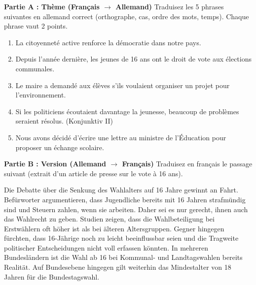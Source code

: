 \documentclass[11pt]{article}
\begin{document}
\begin{exercice}

\textbf{Partie A : Thème (Français $\rightarrow$ Allemand)}
Traduisez les 5 phrases suivantes en allemand correct (orthographe, cas, ordre des mots, temps). Chaque phrase vaut 2 points.

\begin{enumerate}
    \item La citoyenneté active renforce la démocratie dans notre pays.
    \item Depuis l'année dernière, les jeunes de 16 ans ont le droit de vote aux élections communales.
    \item Le maire a demandé aux élèves s'ils voulaient organiser un projet pour l'environnement.
    \item Si les politiciens écoutaient davantage la jeunesse, beaucoup de problèmes seraient résolus. (Konjunktiv II)
    \item Nous avons décidé d'écrire une lettre au ministre de l'Éducation pour proposer un échange scolaire.
\end{enumerate}

\textbf{Partie B : Version (Allemand $\rightarrow$ Français)}
Traduisez en français le passage suivant (extrait d'un article de presse sur le vote à 16 ans).

\begin{textebox}
Die Debatte über die Senkung des Wahlalters auf 16 Jahre gewinnt an Fahrt. Befürworter argumentieren, dass Jugendliche bereits mit 16 Jahren strafmündig sind und Steuern zahlen, wenn sie arbeiten. Daher sei es nur gerecht, ihnen auch das Wahlrecht zu geben. Studien zeigen, dass die Wahlbeteiligung bei Erstwählern oft höher ist als bei älteren Altersgruppen. Gegner hingegen fürchten, dass 16-Jährige noch zu leicht beeinflussbar seien und die Tragweite politischer Entscheidungen nicht voll erfassen könnten. In mehreren Bundesländern ist die Wahl ab 16 bei Kommunal- und Landtagswahlen bereits Realität. Auf Bundesebene hingegen gilt weiterhin das Mindestalter von 18 Jahren für die Bundestagswahl.
\end{textebox}
\end{exercice}
\end{document}
